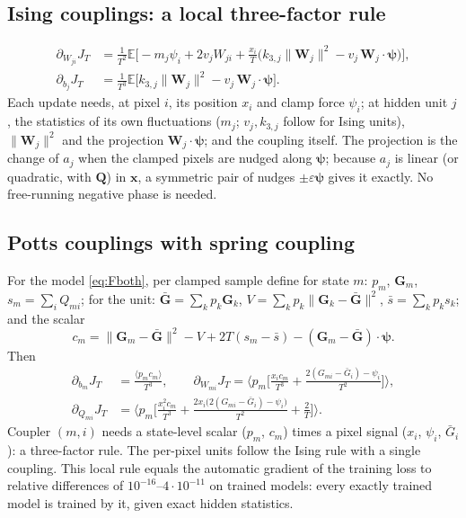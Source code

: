 \documentclass[11pt,a4paper]{article}
\newcommand{\vx}{\bm{x}}
\newcommand{\E}{\mathbb{E}}
\begin{document}
\subsection{Ising couplings: a local three-factor rule}
\begin{align}
  \partial_{W_{ji}}J_T&=\frac1{T^2}\E\Big[-m_j\psi_i+2v_jW_{ji}+\frac{x_i}{T}\big(k_{3,j}\|\bm W_j\|^2-v_j\,\bm W_j\cdot\bm\psi\big)\Big],\\
  \partial_{b_j}J_T&=\frac1{T^3}\E\Big[k_{3,j}\|\bm W_j\|^2-v_j\,\bm W_j\cdot\bm\psi\Big].
\end{align}
Each update needs, at pixel $i$, its position $x_i$ and clamp force $\psi_i$; at hidden unit $j$, the statistics of
its own fluctuations ($m_j$; $v_j,k_{3,j}$ follow for Ising units), $\|\bm W_j\|^2$ and the projection
$\bm W_j\cdot\bm\psi$; and the coupling itself. The projection is the change of $a_j$ when the clamped pixels are
nudged along $\bm\psi$; because $a_j$ is linear (or quadratic, with $\bm Q$) in $\vx$, a symmetric pair of nudges
$\pm\varepsilon\bm\psi$ gives it exactly. No free-running negative phase is needed.

\subsection{Potts couplings with spring coupling}
For the model \eqref{eq:Fboth}, per clamped sample define for state $m$: $p_m$, $\bm G_m$, $s_m=\sum_iQ_{mi}$; for
the unit: $\bar{\bm G}=\sum_kp_k\bm G_k$, $V=\sum_kp_k\|\bm G_k-\bar{\bm G}\|^2$, $\bar s=\sum_kp_ks_k$; and the scalar
\begin{equation}
  c_m=\|\bm G_m-\bar{\bm G}\|^2-V+2T(s_m-\bar s)-(\bm G_m-\bar{\bm G})\cdot\bm\psi .
\end{equation}
Then
\begin{align}
  \partial_{b_m}J_T&=\frac{\langle p_mc_m\rangle}{T^3},\qquad
  \partial_{W_{mi}}J_T=\Big\langle p_m\Big[\frac{x_ic_m}{T^3}+\frac{2(G_{mi}-\bar G_i)-\psi_i}{T^2}\Big]\Big\rangle,\\
  \partial_{Q_{mi}}J_T&=\Big\langle p_m\Big[\frac{x_i^2c_m}{T^3}+\frac{2x_i\big(2(G_{mi}-\bar G_i)-\psi_i\big)}{T^2}+\frac2T\Big]\Big\rangle .
\end{align}
Coupler $(m,i)$ needs a state-level scalar ($p_m$, $c_m$) times a pixel signal ($x_i$, $\psi_i$, $\bar G_i$): a
three-factor rule. The per-pixel units follow the Ising rule with a single coupling. This local rule equals the
automatic gradient of the training loss to relative differences of $10^{-16}$--$4\cdot10^{-11}$ on trained models:
every exactly trained model is trained by it, given exact hidden statistics.
\end{document}
